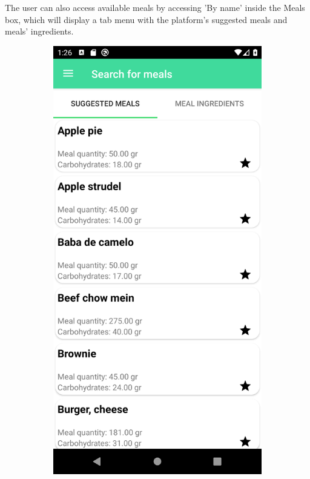 The user can also access available meals by accessing 'By name' inside the Meals box, which will display a tab menu with the
platform's suggested meals and meals' ingredients.\\

\begin{figure}[H]
    \captionsetup[subfigure]{justification=centering}
    \begin{center}
        \begin{subfigure}{.3\textwidth}
            \includegraphics[scale=0.1, width=\textwidth]{_figures/suggested_meals.png}

\end{subfigure}
\end{center}
\end{figure}
